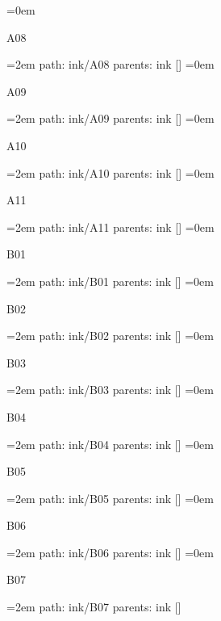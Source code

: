 \smallskip
\leftskip=0em
\par\endgroup
\bigskip
{}
A08
\smallskip
\par\begingroup
\leftskip=2em
path: ink/A08
\smallskip
parents:  ink []
\smallskip
\leftskip=0em
\par\endgroup
\bigskip
{}
A09
\smallskip
\par\begingroup
\leftskip=2em
path: ink/A09
\smallskip
parents:  ink []
\smallskip
\leftskip=0em
\par\endgroup
\bigskip
{}
A10
\smallskip
\par\begingroup
\leftskip=2em
path: ink/A10
\smallskip
parents:  ink []
\smallskip
\leftskip=0em
\par\endgroup
\bigskip
{}
A11
\smallskip
\par\begingroup
\leftskip=2em
path: ink/A11
\smallskip
parents:  ink []
\smallskip
\leftskip=0em
\par\endgroup
\bigskip
{}
B01
\smallskip
\par\begingroup
\leftskip=2em
path: ink/B01
\smallskip
parents:  ink []
\smallskip
\leftskip=0em
\par\endgroup
\bigskip
{}
B02
\smallskip
\par\begingroup
\leftskip=2em
path: ink/B02
\smallskip
parents:  ink []
\smallskip
\leftskip=0em
\par\endgroup
\bigskip
{}
B03
\smallskip
\par\begingroup
\leftskip=2em
path: ink/B03
\smallskip
parents:  ink []
\smallskip
\leftskip=0em
\par\endgroup
\bigskip
{}
B04
\smallskip
\par\begingroup
\leftskip=2em
path: ink/B04
\smallskip
parents:  ink []
\smallskip
\leftskip=0em
\par\endgroup
\bigskip
{}
B05
\smallskip
\par\begingroup
\leftskip=2em
path: ink/B05
\smallskip
parents:  ink []
\smallskip
\leftskip=0em
\par\endgroup
\bigskip
{}
B06
\smallskip
\par\begingroup
\leftskip=2em
path: ink/B06
\smallskip
parents:  ink []
\smallskip
\leftskip=0em
\par\endgroup
\bigskip
{}
B07
\smallskip
\par\begingroup
\leftskip=2em
path: ink/B07
\smallskip
parents:  ink []
